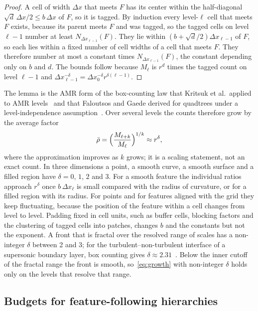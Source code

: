 \documentclass[12pt]{article}
\theoremstyle{remark}
\begin{document}
\begin{proof}
A cell of width $\Delta x$ that meets $F$ has its center within the half-diagonal $\sqrt d\,\Delta x/2\le b\,\Delta x$ of $F$, so it is tagged. By induction every level-$\ell$ cell that meets $F$ exists, because its parent meets $F$ and was tagged, so the tagged cells on level $\ell-1$ number at least $N_{\Delta x_{\ell-1}}(F)$. They lie within $(b+\sqrt d/2)\Delta x_{\ell-1}$ of $F$, so each lies within a fixed number of cell widths of a cell that meets $F$. They therefore number at most a constant times $N_{\Delta x_{\ell-1}}(F)$, the constant depending only on $b$ and $d$. The bounds follow because $M_\ell$ is $r^d$ times the tagged count on level $\ell-1$ and $\Delta x_{\ell-1}^{-\delta}=\Delta x_0^{-\delta}r^{\delta(\ell-1)}$.
\end{proof}

The lemma is the AMR form of the box-counting law that Kritsuk et al.\ applied to AMR levels~\cite{kritsuk2006adaptive} and that Faloutsos and Gaede derived for quadtrees under a level-independence assumption~\cite{faloutsos1996analysis}. Over several levels the counts therefore grow by the average factor
\begin{equation}\label{eq:growth}
\bar\rho=\Bigl(\frac{M_{\ell+k}}{M_\ell}\Bigr)^{1/k}\approx r^{\delta},
\end{equation}
where the approximation improves as $k$ grows; it is a scaling statement, not an exact count. In three dimensions a point, a smooth curve, a smooth surface and a filled region have $\delta=0$, $1$, $2$ and $3$. For a smooth feature the individual ratios approach $r^\delta$ once $b\,\Delta x_\ell$ is small compared with the radius of curvature, or for a filled region with its radius. For points and for features aligned with the grid they keep fluctuating, because the position of the feature within a cell changes from level to level. Padding fixed in cell units, such as buffer cells, blocking factors and the clustering of tagged cells into patches, changes $b$ and the constants but not the exponent. A front that is fractal over the resolved range of scales has a non-integer $\delta$ between 2 and 3; for the turbulent--non-turbulent interface of a supersonic boundary layer, box counting gives $\delta\approx2.31$~\cite{zhuang2018fractal}. Below the inner cutoff of the fractal range the front is smooth, so~\eqref{eq:growth} with non-integer $\delta$ holds only on the levels that resolve that range.

\subsection{Budgets for feature-following hierarchies}\label{sec:feature}
\end{document}

